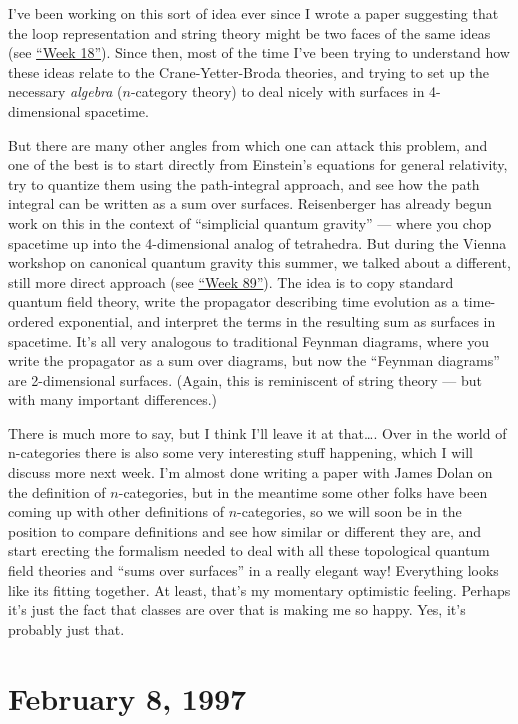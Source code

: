 \documentclass{article}
\begin{document}
I've been working on this sort of idea ever since I wrote a paper
suggesting that the loop representation and string theory might be two
faces of the same ideas (see \protect\hyperlink{week18}{``Week 18''}).
Since then, most of the time I've been trying to understand how these
ideas relate to the Crane-Yetter-Broda theories, and trying to set up
the necessary \emph{algebra} (\(n\)-category theory) to deal nicely with
surfaces in 4-dimensional spacetime.

But there are many other angles from which one can attack this problem,
and one of the best is to start directly from Einstein's equations for
general relativity, try to quantize them using the path-integral
approach, and see how the path integral can be written as a sum over
surfaces. Reisenberger has already begun work on this in the context of
``simplicial quantum gravity'' --- where you chop spacetime up into the
4-dimensional analog of tetrahedra. But during the Vienna workshop on
canonical quantum gravity this summer, we talked about a different,
still more direct approach (see \protect\hyperlink{week89}{``Week
89''}). The idea is to copy standard quantum field theory, write the
propagator describing time evolution as a time-ordered exponential, and
interpret the terms in the resulting sum as surfaces in spacetime. It's
all very analogous to traditional Feynman diagrams, where you write the
propagator as a sum over diagrams, but now the ``Feynman diagrams'' are
2-dimensional surfaces. (Again, this is reminiscent of string theory ---
but with many important differences.)

There is much more to say, but I think I'll leave it at that\ldots. Over
in the world of n-categories there is also some very interesting stuff
happening, which I will discuss more next week. I'm almost done writing
a paper with James Dolan on the definition of \(n\)-categories, but in
the meantime some other folks have been coming up with other definitions
of \(n\)-categories, so we will soon be in the position to compare
definitions and see how similar or different they are, and start
erecting the formalism needed to deal with all these topological quantum
field theories and ``sums over surfaces'' in a really elegant way!
Everything looks like its fitting together. At least, that's my
momentary optimistic feeling. Perhaps it's just the fact that classes
are over that is making me so happy. Yes, it's probably just that.
\hypertarget{week97}{%
\section{February 8, 1997}\label{week97}}
\end{document}
